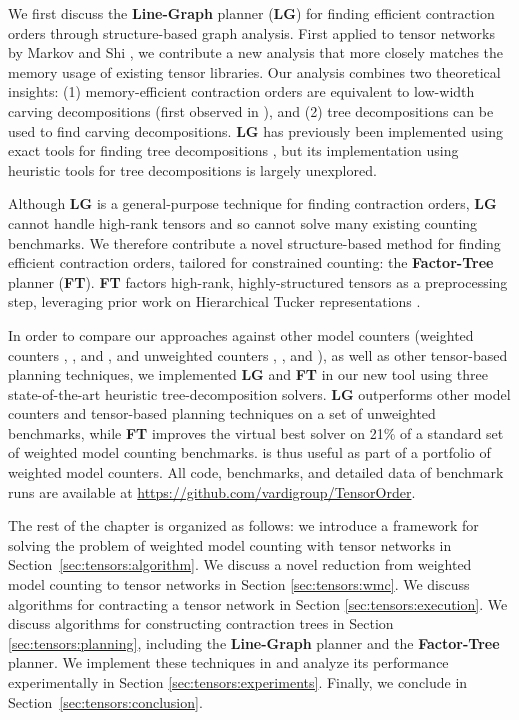 We first discuss the \textbf{Line-Graph} planner (\textbf{LG}) for finding efficient contraction orders through structure-based graph analysis. First applied to tensor networks by Markov and Shi \cite{MS08}, we contribute a new analysis that more closely matches the memory usage of existing tensor libraries. Our analysis combines two theoretical insights: (1) memory-efficient contraction orders are equivalent to low-width carving decompositions (first observed in \cite{de15}), and (2) tree decompositions can be used to find carving decompositions. \textbf{LG} has previously been implemented using exact tools for finding tree decompositions \cite{DFGHSW18}, but its implementation using heuristic tools for tree decompositions is largely unexplored.

Although \textbf{LG} is a general-purpose technique for finding contraction orders, \textbf{LG} cannot handle high-rank tensors and so cannot solve many existing counting benchmarks. We therefore contribute a novel structure-based method for finding efficient contraction orders, tailored for constrained counting: the \textbf{Factor-Tree} planner (\textbf{FT}). \textbf{FT} factors high-rank, highly-structured tensors as a preprocessing step, leveraging prior work on Hierarchical Tucker representations \cite{Grasedyck10}.

In order to compare our approaches against other model counters (weighted counters  \cite{SBK05},  \cite{OD15}, and  \cite{LM17}, and unweighted counters  \cite{CW16},  \cite{FHMW17}, and  \cite{Thurley2006}), as well as other tensor-based planning techniques, we implemented \textbf{LG} and \textbf{FT} in our new tool  using three state-of-the-art heuristic tree-decomposition solvers. \textbf{LG} outperforms other model counters and tensor-based planning techniques on a set of unweighted benchmarks, while \textbf{FT} improves the virtual best solver on 21\% of a standard set of weighted model counting benchmarks.  is thus useful as part of a portfolio of weighted model counters. All code, benchmarks, and detailed data of benchmark runs are available at \url{https://github.com/vardigroup/TensorOrder}.


The rest of the chapter is organized as follows: we introduce a framework for solving the problem of weighted model counting with tensor networks in Section~\ref{sec:tensors:algorithm}.
We discuss a novel reduction from weighted model counting to tensor networks in Section \ref{sec:tensors:wmc}.
We discuss algorithms for contracting a tensor network in Section \ref{sec:tensors:execution}.
We discuss algorithms for constructing contraction trees in Section \ref{sec:tensors:planning}, including the \textbf{Line-Graph} planner and the \textbf{Factor-Tree} planner.
We implement these techniques in  and analyze its performance experimentally in Section \ref{sec:tensors:experiments}.
Finally, we conclude in Section~\ref{sec:tensors:conclusion}.
